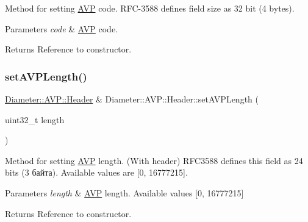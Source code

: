 Method for setting \hyperlink{classDiameter_1_1AVP}{A\+VP} code. R\+F\+C-\/3588 defines field size as 32 bit (4 bytes). 


\begin{DoxyParams}{Parameters}
{\em code} & \hyperlink{classDiameter_1_1AVP}{A\+VP} code. \\
\hline
\end{DoxyParams}
\begin{DoxyReturn}{Returns}
Reference to constructor. 
\end{DoxyReturn}
\mbox{\label{classDiameter_1_1AVP_1_1Header_a3d1f5e2e4f7779c6aead3ee8236f7e6d}} 
\subsubsection{\texorpdfstring{set\+A\+V\+P\+Length()}{setAVPLength()}}
{\footnotesize\ttfamily \hyperlink{classDiameter_1_1AVP_1_1Header}{Diameter\+::\+A\+V\+P\+::\+Header} \& Diameter\+::\+A\+V\+P\+::\+Header\+::set\+A\+V\+P\+Length (\begin{DoxyParamCaption}\item[{uint32\+\_\+t}]{length }\end{DoxyParamCaption})}



Method for setting \hyperlink{classDiameter_1_1AVP}{A\+VP} length. (With header) R\+F\+C3588 defines this field as 24 bits (3 байта). Available values are \mbox{[}0, 16777215\mbox{]}. 


\begin{DoxyParams}{Parameters}
{\em length} & \hyperlink{classDiameter_1_1AVP}{A\+VP} length. Available values \mbox{[}0, 16777215\mbox{]} \\
\hline
\end{DoxyParams}
\begin{DoxyReturn}{Returns}
Reference to constructor. 
\end{DoxyReturn}
\mbox{\label{classDiameter_1_1AVP_1_1Header_aa95dc9f6cb0461c20ffbec994cfb4fcd}} 
